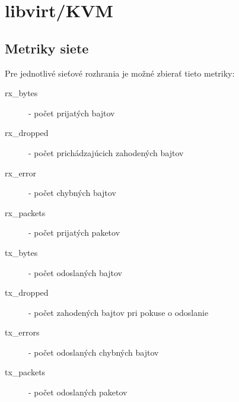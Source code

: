 \documentclass[11pt,final,oneside]{fithesis}
\begin{document}
\section{libvirt/KVM}

\subsection{Metriky siete}
Pre jednotlivé sieťové rozhrania je možné zbierať tieto metriky:
\begin{description}
\item[rx\_bytes] - počet prijatých bajtov
\item[rx\_dropped] - počet prichádzajúcich zahodených bajtov
\item[rx\_error] - počet chybných bajtov
\item[rx\_packets] - počet prijatých paketov
\item[tx\_bytes] - počet odoslaných bajtov
\item[tx\_dropped] - počet zahodených bajtov pri pokuse o odoslanie
\item[tx\_errors] - počet odoslaných chybných bajtov
\item[tx\_packets] - počet odoslaných paketov
\end{description}
\end{document}

